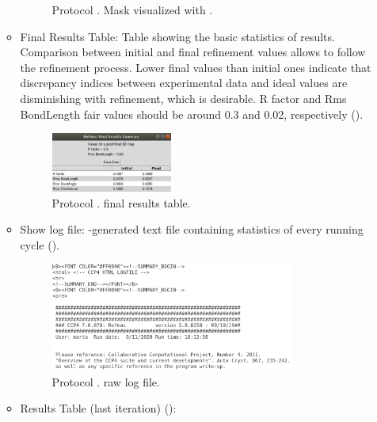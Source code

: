 \begin{itemize}
\begin{itemize}
\begin{figure}[H]
         \caption{Protocol . Mask visualized with \chimera.}
         \label{fig:app_protocol_refmac_4}
        \end{figure}
     \item Final Results Table:
     Table showing the basic statistics of  results. Comparison between initial and final refinement values allows to follow the refinement process. Lower final values than initial ones indicate that discrepancy indices between experimental data and ideal values are disminishing with refinement, which is desirable. R factor and Rms BondLength fair values should be around 0.3 and 0.02, respectively ().
        \begin{figure}[H]
         \centering 
         \captionsetup{width=.9\linewidth} 
         \includegraphics[width=0.40\textwidth]{Images_appendix/Fig130.pdf}
         \caption{Protocol .  final results table.}
         \label{fig:app_protocol_refmac_5}
        \end{figure}
     \item Show log file:
     -generated text file containing statistics of every  running cycle ().
        \begin{figure}[H]
         \centering 
         \captionsetup{width=.9\linewidth} 
         \includegraphics[width=0.80\textwidth]{Images_appendix/Fig131.pdf}
         \caption{Protocol .  raw log file.}
         \label{fig:app_protocol_refmac_6}
        \end{figure}
     \item Results Table (last iteration) ():
        \begin{figure}[H]

\end{figure}
\end{itemize}
\end{itemize}
